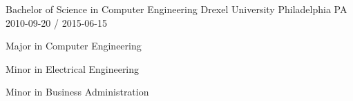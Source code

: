 \begin{cventries}
 
  \cventry
    {Bachelor of Science in Computer Engineering}
    {Drexel University}
    {Philadelphia PA}
    {2010-09-20 / 2015-06-15}
    {
          \begin{cvitems}
                \item{Major in Computer Engineering}
                \item{Minor in Electrical Engineering}
                \item{Minor in Business Administration}
          \end{cvitems}
    }
 
\end{cventries}
